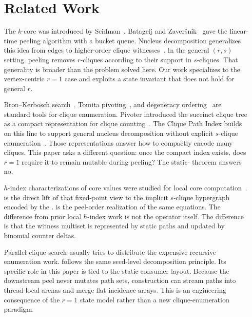 \section{Related Work}\label{sec:related}

The \(k\)-core was introduced by Seidman~\cite{kcoreSeidman}.
%
Batagelj and Zaver\v{s}nik~\cite{coreAlg} gave the linear-time peeling algorithm with a bucket queue.
%
Nucleus decomposition generalizes this idea from edges to higher-order clique witnesses~\cite{nucleusSariyuce14}.
%
In the general \((r,s)\) setting, peeling removes \(r\)-cliques according to their support in \(s\)-cliques.
%
That generality is broader than the problem solved here.
%
Our work specializes to the vertex-centric \(r=1\) case and exploits a state invariant that does not hold for general \(r\).

Bron--Kerbosch search~\cite{BronKerbosch}, Tomita pivoting~\cite{tomita}, and degeneracy ordering~\cite{eppstein} are standard tools for clique enumeration.
%
Pivoter introduced the succinct clique tree as a compact representation for clique counting~\cite{Pivoter}.
%
The Clique Path Index builds on this line to support general nucleus decomposition without explicit \(s\)-clique enumeration~\cite{NuclearCD}.
%
Those representations answer how to compactly encode many cliques.
%
This paper asks a different question: once the compact index exists, does \(r=1\) require it to remain mutable during peeling?
%
The static-\cpi{} theorem answers no.

\(h\)-index characterizations of core values were studied for local core computation~\cite{lu2016hcore,kcoreLocal,hindex}.
%
\localH{} is the direct lift of that fixed-point view to the implicit \(s\)-clique hypergraph encoded by the \cpi{}.
%
\peelH{} is the peel-order realization of the same equations.
%
The difference from prior local \(h\)-index work is not the operator itself.
%
The difference is that the witness multiset is represented by static \cpi{} paths and updated by binomial counter deltas.

Parallel clique search usually tries to distribute the expensive recursive enumeration work.
%
\paraBuild{} follows the same seed-level decomposition principle.
%
Its specific role in this paper is tied to the static consumer layout.
%
Because the downstream peel never mutates path sets, construction can stream paths into thread-local arenas and merge flat incidence arrays.
%
This is an engineering consequence of the \(r=1\) state model rather than a new clique-enumeration paradigm.

